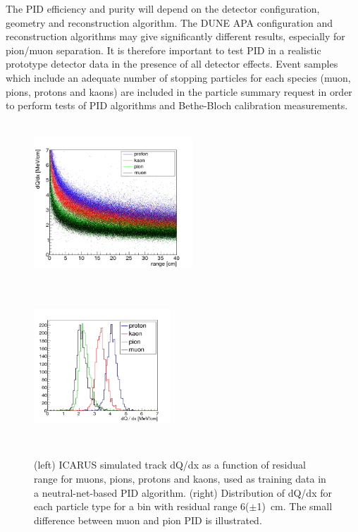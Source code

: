 The PID efficiency and purity will  depend on the detector configuration, geometry and 
reconstruction algorithm. The DUNE APA configuration and reconstruction algorithms
may give significantly different results, especially for pion/muon separation. 
It is therefore important to test PID in a realistic prototype detector
data in the presence of all detector effects.
Event samples which include an adequate number of stopping particles for each species
(muon, pions, protons and kaons) are included in the particle summary request in order to 
perform tests of PID algorithms and Bethe-Bloch calibration measurements.


\begin{figure}[h!]
  \centering
\includegraphics[width=0.53\textwidth,height=6.0cm]{figures/pids_new}
\includegraphics[width=0.46\textwidth,height=6.0cm]{figures/prkpimu_new}
  \caption{(left) ICARUS simulated track dQ/dx as a function of residual range for muons, pions, protons and kaons, used as training data in a neutral-net-based PID algorithm. (right) Distribution of dQ/dx for each particle type for a bin with residual range 
6($\pm$1)~cm. The small difference between muon and pion PID is illustrated.
}
\label{fig:resrange}
\end{figure}




